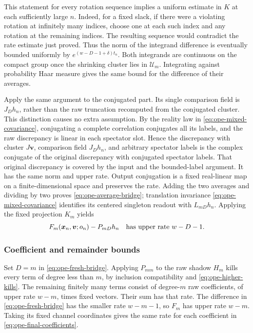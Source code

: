 This statement for every rotation sequence implies a uniform estimate in
$K$ at each sufficiently large $n$. Indeed, for a fixed slack, if there
were a violating rotation at infinitely many indices, choose one at each
such index and any rotation at the remaining indices. The resulting
sequence would contradict the rate estimate just proved. Thus the norm
of the integrand difference is eventually bounded uniformly by
$e^{(w-D-1+\delta)t_n}$. Both integrands are continuous on the compact
group once the shrinking cluster lies in $\mathcal U_m$. Integrating
against probability Haar measure gives the same bound for the difference
of their averages.

Apply the same argument to the conjugated part. Its single comparison
field is $J_Dh_n$, rather than the raw truncation recomputed from the
conjugated cluster. This distinction causes no extra assumption.
By the reality law in \eqref{eq:ope-mixed-covariance}, conjugating a
complete correlation conjugates all its labels, and the
raw discrepancy is linear in each spectator slot. Hence the discrepancy
with cluster $J\boldsymbol v$, comparison field $J_Dh_n$, and arbitrary
spectator labels is the complex conjugate of the original discrepancy
with conjugated spectator labels. That original discrepancy is covered
by the input and the bounded-label argument. It has the same norm and
upper rate. Output conjugation is a fixed real-linear map on a
finite-dimensional space and preserves the rate. Adding the two averages
and dividing by two proves \eqref{eq:ope-average-bridge}; translation
invariance \eqref{eq:ope-mixed-covariance} identifies its centered singleton readout with $L_{mD}h_n$.
Applying the fixed projection $K_m$ yields
\begin{equation}\label{eq:ope-fresh-bridge}
 F_m(\boldsymbol x_n,\boldsymbol v;o_n)-P_{mD}h_n
                    \quad\hbox{has upper rate }w-D-1.
\end{equation}

\subsubsection{Coefficient and remainder bounds}
Set $D=m$ in \eqref{eq:ope-fresh-bridge}. Applying $P_{mm}$ to the raw
shadow $H_m$ kills every term of degree less than $m$, by inclusion
compatibility and \eqref{eq:ope-higher-kills}. The remaining finitely many
terms consist of degree-$m$ raw coefficients, of upper rate $w-m$,
times fixed vectors. Their sum has that rate. The difference in
\eqref{eq:ope-fresh-bridge} has the smaller rate $w-m-1$, so
$F_m$ has upper rate $w-m$. Taking its fixed channel coordinates gives
the same rate for each coefficient in
\eqref{eq:ope-final-coefficients}.

